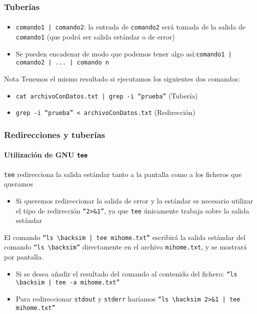 \documentclass[12pt]{beamer}
\begin{document}
\begin{frame}
  \frametitle{Tuberías}
  \framesubtitle{}
  \begin{itemize}
    \item \texttt{comando1 | comando2}: la entrada de \texttt{comando2} será tomada de la salida de \texttt{comando1} (que podrá ser salida estándar o de error)
    \medskip
    \item Se pueden encadenar de modo que podemos tener algo así:\medskip\linebreak\texttt{comando1 | comando2 | ... | comando n}
  \end{itemize}
  \begin{block}{Nota}
    Tenemos el mismo resultado si ejecutamos los siguientes dos comandos:
    \begin{itemize}
      \item \texttt{cat archivoConDatos.txt | grep -i ``prueba''} (Tubería)
      \item \texttt{grep -i ``prueba'' < archivoConDatos.txt} (Redirección)
    \end{itemize}
  \end{block}
\end{frame}

\begin{frame}
  \frametitle{Redirecciones y tuberías}
  \framesubtitle{Utilización de GNU \texttt{tee}}
  \texttt{tee} redirecciona la salida estándar tanto a la pantalla como a los ficheros que queramos
  \medskip
  \begin{itemize}
    \item Si queremos redireccionar la salida de error y la estándar es necesario utilizar el tipo de redirección \texttt{``2>\&1''}, ya que \texttt{tee} únicamente trabaja sobre la salida estándar
  \end{itemize}
  \medskip
  El comando \texttt{``ls $\backsim$ | tee mihome.txt''} escribirá la salida estándar del comando \texttt{``ls $\backsim$''} directamente en el archivo \texttt{mihome.txt}, y se mostrará por pantalla.
  \medskip
  \begin{itemize}
    \item Si se desea añadir el resultado del comando al contenido del fichero: \texttt{``ls $\backsim$ | tee -a mihome.txt''}
    \medskip
    \item Para redireccionar \texttt{stdout} y \texttt{stderr} haríamos \texttt{``ls $\backsim$ 2>\&1 | tee mihome.txt''}
  \end{itemize}

\end{frame}
\end{document}
